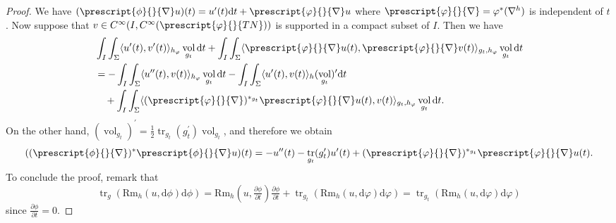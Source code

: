 \documentclass{article}
\numberwithin{equation}{section}        %
\theoremstyle{bfnote}
\theoremstyle{definition}
\theoremstyle{bfremark}
\newcommand{\diff}{\mathrm{d}}                      %
\DeclareMathOperator{\vol}{vol}                 %
\DeclareMathOperator{\tr}{tr}                   %
\begin{document}
\begin{proof}
    We have $(\prescript{\phi}{}{\nabla} u)(t) = u^\prime(t) \diff t + \prescript{\varphi}{}{\nabla} u$ where $\prescript{\varphi}{}{\nabla}= \varphi^*(\nabla^h)$ is independent of $t$. Now suppose that $v \in C^\infty(I, C^{\infty}(\prescript{\varphi}{}{TN}))$ is supported in a compact subset of $I$. Then we have
    \begin{align*}
        & \int_I \int_\Sigma \langle u^\prime(t), v^\prime(t) \rangle_{h_\varphi} \vol_{g_t} \diff t + \int_I \int_\Sigma \langle \prescript{\varphi}{}{\nabla} u(t) , \prescript{\varphi}{}{\nabla} v(t) \rangle_{g_t,h_\varphi} \vol_{g_t} \diff t \\
        & = - \int_I \int_\Sigma \langle u^{\prime\prime}(t), v(t) \rangle_{h_\varphi} \vol_{g_t} \diff t - \int_I \int_\Sigma \langle u^\prime(t), v(t) \rangle_{h} (\vol_{g_t})^\prime \diff t \\
        & ~~~ + \int_I \int_\Sigma \langle (\prescript{\varphi}{}{\nabla})^{*_{g_t}}\prescript{\varphi}{}{\nabla} u(t) , v(t) \rangle_{g_t,h_\varphi} \vol_{g_t} \diff t .
    \end{align*}
    On the other hand, $(\vol_{g_t})^\prime = \frac{1}{2} \tr_{g_t}(g^\prime_t)\vol_{g_t}$, and therefore we obtain
    \begin{equation*}
        ((\prescript{\phi}{}{\nabla})^*\prescript{\phi}{}{\nabla} u)(t) = - u^{\prime\prime}(t) - \tr_{g_t}(g^\prime_t) u^\prime(t) + (\prescript{\varphi}{}{\nabla})^{*_{g_t}}\prescript{\varphi}{}{\nabla} u(t) .
    \end{equation*}
    To conclude the proof, remark that
    \begin{equation*}
        \tr_{g} (\mathrm{Rm}_h(u,\diff \phi)\diff \phi) = \mathrm{Rm}_h(u,\tfrac{\partial \phi}{\partial t})\tfrac{\partial \phi}{\partial t} + \tr_{g_t}(\mathrm{Rm}_h(u,\diff\varphi)\diff\varphi) = \tr_{g_t}(\mathrm{Rm}_h(u,\diff \varphi)\diff \varphi)
    \end{equation*}
    since $\frac{\partial \phi}{\partial t} = 0$.
\end{proof}
\end{document}
